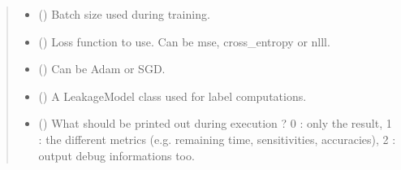 \documentclass[letterpaper,10pt,english]{sphinxmanual}
\begin{document}
\begin{fulllineitems}
\begin{fulllineitems}
\begin{quote}
\begin{description}
\begin{itemize}
\item {} 
\sphinxAtStartPar
{} (\sphinxstyleliteralemphasis{\sphinxupquote{, }}) \textendash{} Batch size used during training.

\item {} 
\sphinxAtStartPar
{} (\sphinxstyleliteralemphasis{\sphinxupquote{, }}) \textendash{} Loss function to use. Can be mse, cross\_entropy or nlll.

\item {} 
\sphinxAtStartPar
{} (\sphinxstyleliteralemphasis{\sphinxupquote{, }}) \textendash{} Can be Adam or SGD.

\item {} 
\sphinxAtStartPar
{} (\sphinxstyleliteralemphasis{\sphinxupquote{, }}\sphinxstyleliteralemphasis{\sphinxupquote{(}}\sphinxstyleliteralemphasis{\sphinxupquote{)}}) \textendash{} A LeakageModel class used for label computations.

\item {} 
\sphinxAtStartPar
{} (\sphinxstyleliteralemphasis{\sphinxupquote{, }}) \textendash{} What should be printed out during execution ? 0 : only the result,
1 : the different metrics (e.g. remaining time, sensitivities, accuracies),
2 : output debug informations too.


\end{itemize}
\end{description}
\end{quote}
\end{fulllineitems}
\end{fulllineitems}
\end{document}
